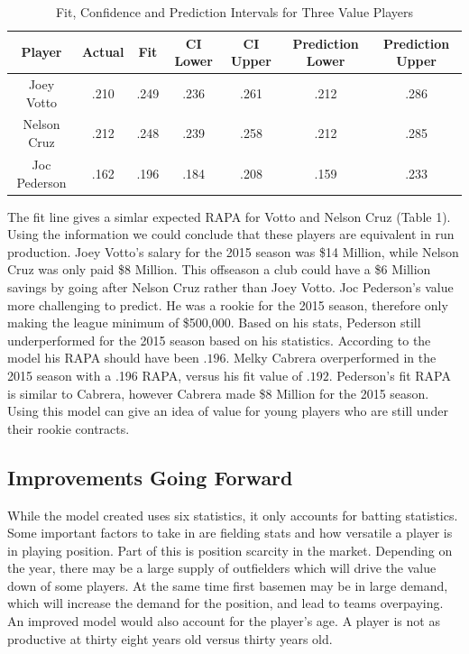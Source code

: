 \documentclass[12pt]{article}
\begin{document}
\begin{table}[]
\centering
\caption{Fit, Confidence and Prediction Intervals for Three Value Players}
\begin{tabular}{|c|c|c|c|c|c|c|}
\hline
\textbf{Player} & \textbf{Actual} & \textbf{Fit} & \textbf{CI Lower} & \textbf{CI Upper} & \textbf{Prediction Lower} & \textbf{Prediction Upper} \\ \hline
Joey Votto      & .210            & .249         & .236              & .261              & .212                      & .286                      \\ \hline
Nelson Cruz     & .212            & .248         & .239              & .258              & .212                      & .285                      \\ \hline
Joc Pederson    & .162            & .196         & .184              & .208              & .159                      & .233                      \\ \hline
\end{tabular}
\end{table}

\qquad The fit line gives a simlar expected RAPA for Votto and Nelson Cruz (Table 1). Using the information we could conclude that these players are equivalent in run production. Joey Votto's salary for the 2015 season was \$14 Million, while Nelson Cruz was only paid \$8 Million. This offseason a club could have a \$6 Million savings by going after Nelson Cruz rather than Joey Votto. Joc Pederson's value more challenging to predict. He was a rookie for the 2015 season, therefore only making the league minimum of \$500,000. Based on his stats, Pederson still underperformed for the 2015 season based on his statistics. According to the model his RAPA should have been $.196$. Melky Cabrera overperformed in the 2015 season with a .196 RAPA, versus his fit value of $.192$. Pederson's fit RAPA is similar to Cabrera, however Cabrera made \$8 Million for the 2015 season. Using this model can give an idea of value for young players who are still under their rookie contracts.

\subsection{Improvements Going Forward}
\qquad While the model created uses six statistics, it only accounts for batting statistics. Some important factors to take in are fielding stats and how versatile a player is in playing position. Part of this is position scarcity in the market. Depending on the year, there may be a large supply of outfielders which will drive the value down of some players. At the same time first basemen may be in large demand, which will increase the demand for the position, and lead to teams overpaying. An improved model would also account for the player's age. A player is not as productive at thirty eight years old versus thirty years old. 
\end{document}
